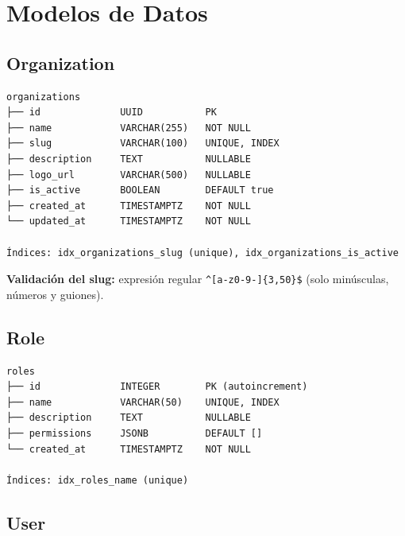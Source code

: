 \section{Modelos de Datos}\label{modelos-de-datos}

\subsection{Organization}\label{organization}

\begin{verbatim}
organizations
├── id              UUID           PK
├── name            VARCHAR(255)   NOT NULL
├── slug            VARCHAR(100)   UNIQUE, INDEX
├── description     TEXT           NULLABLE
├── logo_url        VARCHAR(500)   NULLABLE
├── is_active       BOOLEAN        DEFAULT true
├── created_at      TIMESTAMPTZ    NOT NULL
└── updated_at      TIMESTAMPTZ    NOT NULL

Índices: idx_organizations_slug (unique), idx_organizations_is_active
\end{verbatim}

\textbf{Validación del slug:} expresión regular \texttt{\^{}{[}a-z0-9-{]}\{3,50\}\$} (solo minúsculas, números y guiones).

\subsection{Role}\label{role}

\begin{verbatim}
roles
├── id              INTEGER        PK (autoincrement)
├── name            VARCHAR(50)    UNIQUE, INDEX
├── description     TEXT           NULLABLE
├── permissions     JSONB          DEFAULT []
└── created_at      TIMESTAMPTZ    NOT NULL

Índices: idx_roles_name (unique)
\end{verbatim}

\subsection{User}\label{user}


